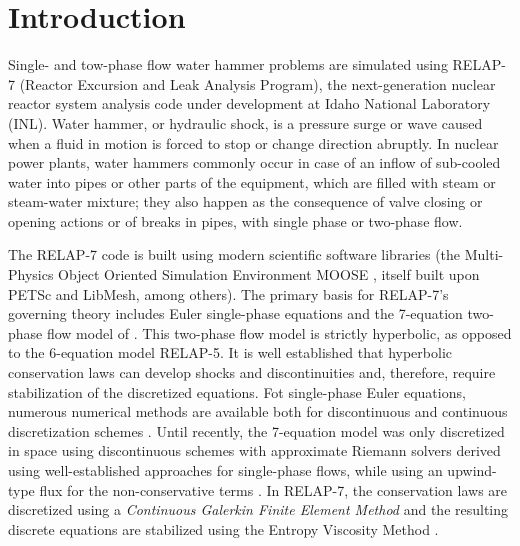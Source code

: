 \documentclass{mc2015}
\begin{document}
\section{Introduction}\label{sec:intro}
%
Single- and tow-phase flow water hammer problems are simulated using RELAP-7 (Reactor Excursion and Leak Analysis Program),
the next-generation nuclear reactor system analysis code under development at Idaho National Laboratory (INL). 
%
Water hammer, or hydraulic shock, is a pressure surge or wave caused when a fluid in motion is forced to stop or change direction abruptly. 
In nuclear power plants, water hammers commonly occur 
in case of an inflow of sub-cooled water into pipes or other parts of the equipment, which are filled with steam or steam-water mixture; they also
happen as the consequence of valve closing or opening actions or of breaks in pipes, with single phase or two-phase flow. 

The RELAP-7 code is built using modern scientific software libraries (the Multi-Physics Object Oriented Simulation Environment MOOSE \cite{MOOSE}, 
itself built upon PETSc and LibMesh, among others).  
%
The primary basis for RELAP-7's governing theory includes Euler single-phase equations \cite{Toro} and the 7-equation two-phase flow model of \cite{SEM}. 
This two-phase flow model is strictly hyperbolic, as opposed to the 6-equation model RELAP-5.  
It is well established that hyperbolic conservation laws can develop shocks and discontinuities \cite{Leveque} and, therefore, require stabilization 
of the discretized equations. Fot single-phase Euler equations, numerous numerical methods are available both for discontinuous and continuous discretization schemes 
\cite{Toro, Lapidus_paper, LMP, Lapidus_book, Roe, SUPG}. Until recently, the 7-equation model was only discretized in space using discontinuous schemes with approximate 
Riemann solvers derived using well-established approaches for single-phase flows, while using an upwind-type flux for the non-conservative terms 
\cite{Saurel_2001a, Saurel_2001b, Li_2004, Zein_2010, Ambroso_2012}. 
%
In RELAP-7, the conservation laws are discretized using a \emph{Continuous Galerkin Finite Element Method} and the resulting discrete equations are stabilized using 
the Entropy Viscosity Method \cite{jlg1, jlg2}.
 
\end{document}
